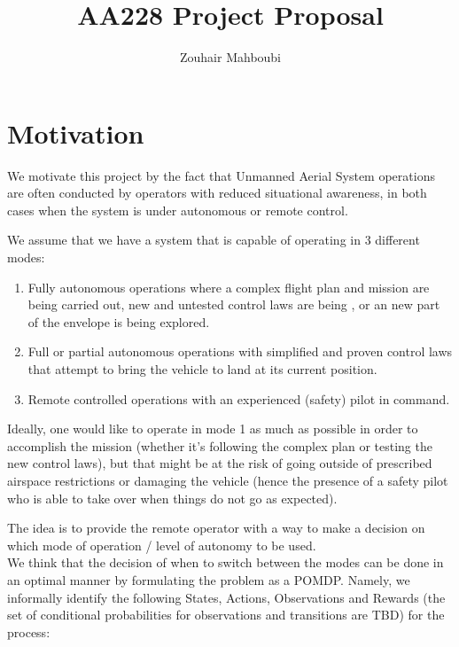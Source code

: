 \documentclass[english]{article}
\title{AA228 Project Proposal\\}
\author{Zouhair Mahboubi}
\begin{document}
 
\maketitle 
\newpage 
\lstset{basicstyle=\footnotesize, breaklines=true, language=Octave}

\section{Motivation}
We motivate this project by the fact that Unmanned Aerial System operations are often conducted by operators with reduced situational awareness, in both cases when the system is under autonomous or remote control.

We assume that we have a system that is capable of operating in 3 different modes:
\begin{enumerate}
\item Fully autonomous operations where a complex flight plan and mission are being carried out, new and untested control laws are being , or an new part of the envelope is being explored.
\item Full or partial autonomous operations with simplified and proven control laws that attempt to bring the vehicle to land at its current position.
\item Remote controlled operations with an experienced (safety) pilot in command.
\end{enumerate}

Ideally, one would like to operate in mode 1 as much as possible in order to accomplish the mission (whether it's following the complex plan or testing the new control laws), but that might be at the risk of going outside of prescribed airspace restrictions or damaging the vehicle (hence the presence of a safety pilot who is able to take over when things do not go as expected).

The idea is to provide the remote operator with a way to make a decision on which mode of operation / level of autonomy to be used.\\

We think that the decision of when to switch between the modes can be done in an optimal manner by formulating the problem as a POMDP. Namely, we informally identify the following States, Actions, Observations and Rewards (the set of conditional probabilities for observations and transitions are TBD) for the process:
\end{document}

